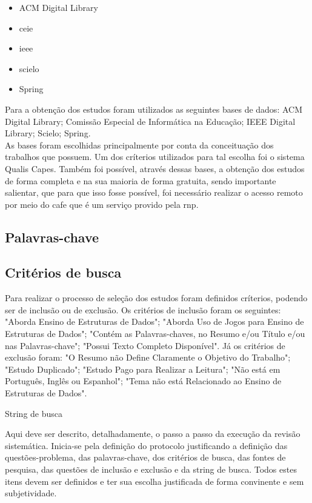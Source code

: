 \documentclass[12pt]{article}
\begin{document}
\begin{itemize}
    \item{ACM Digital Library}
    \item{\gls{ceie}}
    \item{\gls{ieee}}
    \item{\gls{scielo}}
    \item{Spring}
\end{itemize}

Para a obtenção dos estudos foram utilizados as seguintes bases de dados: ACM Digital Library; Comissão Especial de Informática na Educação; IEEE Digital Library; Scielo; Spring.\\
As bases foram escolhidas principalmente por conta da conceituação dos trabalhos que possuem. Um dos críterios utilizados para tal escolha foi o sistema Qualis Capes. Também foi possível, através dessas bases, a obtenção dos estudos de forma completa e na sua maioria de forma gratuita, sendo importante salientar, que para que isso fosse possível, foi necessário realizar o acesso remoto por meio do \gls{cafe} que é um serviço provido pela \gls{rnp}.

\subsection{Palavras-chave}

\subsection{Critérios de busca}


Para realizar o processo de seleção dos estudos foram definidos críterios, podendo ser de inclusão ou de exclusão. Os critérios de inclusão foram os seguintes: "Aborda Ensino de Estruturas de Dados"; "Aborda Uso de Jogos para Ensino de Estruturas de Dados"; "Contém as Palavras-chaves, no Resumo e/ou Título e/ou nas Palavras-chave"; "Possui Texto Completo Disponível". Já os critérios de exclusão foram: "O Resumo não Define Claramente o Objetivo do Trabalho"; "Estudo Duplicado"; "Estudo Pago para Realizar a Leitura"; "Não está em Português, Inglês ou Espanhol"; "Tema não está Relacionado ao Ensino de Estruturas de Dados".

String de busca


Aqui deve ser descrito, detalhadamente, o passo a passo da execução da revisão sistemática. Inicia-se pela definição do protocolo justificando a definição das questões-problema, das palavras-chave, dos critérios de busca, das fontes de pesquisa, das questões de inclusão e exclusão e da string de busca. Todos estes itens devem ser definidos e ter sua escolha justificada de forma convinente e sem subjetividade.
\end{document}
